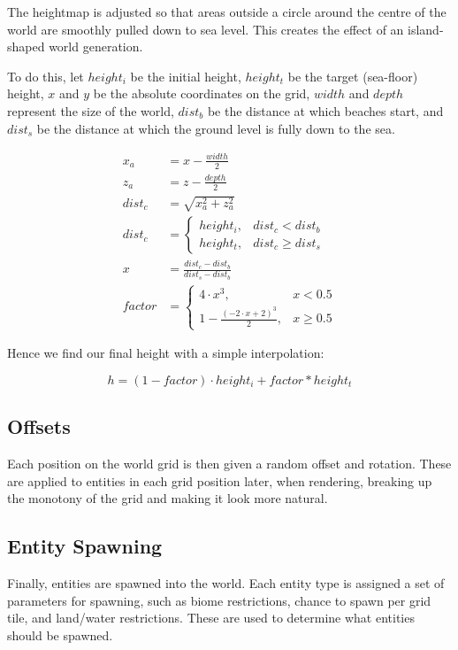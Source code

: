 \documentclass{article}
\begin{document}
\begin{multicols}{2}
        The heightmap is adjusted so that areas outside a circle around the centre of the world are smoothly pulled down to sea level. This creates the effect of an island-shaped world generation.

        To do this, let $height_i$ be the initial height, $height_t$ be the target (sea-floor) height, $x$ and $y$ be the absolute coordinates on the grid, $width$ and $depth$ represent the size of the world, $dist_b$ be the distance at which beaches start, and $dist_s$ be the distance at which the ground level is fully down to the sea.

        \[
            \begin{aligned}
                x_a &= x - \frac{width}{2} \\
                z_a &= z - \frac{depth}{2} \\
                dist_c &= \sqrt{x_a^2 + z_a^2} \\
                dist_c &= \begin{cases}
                    height_i, &dist_c < dist_b \\
                    height_t, &dist_c \ge dist_s
                \end{cases} \\
                x &= \frac{dist_c - dist_b}{dist_s - dist_b} \\
                factor &= \begin{cases}
                    4 \cdot x^3, &x < 0.5 \\
                    1 - \frac{(-2 \cdot x + 2)^3}{2}, &x \ge 0.5
                \end{cases}
            \end{aligned}
        \]

        Hence we find our final height with a simple interpolation:

        \[
            h = (1 - factor) \cdot height_i + factor * height_t
        \]
        
        \subsection{Offsets}
        
        Each position on the world grid is then given a random offset and rotation. These are applied to entities in each grid position later, when rendering, breaking up the monotony of the grid and making it look more natural.
        
        \subsection{Entity Spawning}
        
        Finally, entities are spawned into the world. Each entity type is assigned a set of parameters for spawning, such as biome restrictions, chance to spawn per grid tile, and land/water restrictions. These are used to determine what entities should be spawned.
        

    \end{multicols}
\end{document}
